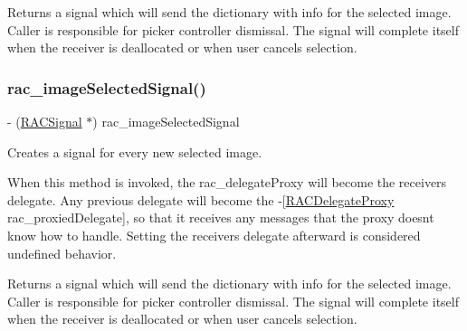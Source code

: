 Returns a signal which will send the dictionary with info for the selected image. Caller is responsible for picker controller dismissal. The signal will complete itself when the receiver is deallocated or when user cancels selection. \mbox{\label{category_u_i_image_picker_controller_07_r_a_c_signal_support_08_ab9e581c9f1e505147acaae5b26c6be13}} 
\subsubsection{\texorpdfstring{rac\+\_\+image\+Selected\+Signal()}{rac\_imageSelectedSignal()}\hspace{0.1cm}{\footnotesize\ttfamily [2/3]}}
{\footnotesize\ttfamily -\/ (\mbox{\hyperlink{interface_r_a_c_signal}{R\+A\+C\+Signal}} $\ast$) rac\+\_\+image\+Selected\+Signal \begin{DoxyParamCaption}{ }\end{DoxyParamCaption}}

Creates a signal for every new selected image.

When this method is invoked, the {\ttfamily rac\+\_\+delegate\+Proxy} will become the receiver\textquotesingle{}s delegate. Any previous delegate will become the -\/\mbox{[}\mbox{\hyperlink{interface_r_a_c_delegate_proxy}{R\+A\+C\+Delegate\+Proxy}} rac\+\_\+proxied\+Delegate\mbox{]}, so that it receives any messages that the proxy doesn\textquotesingle{}t know how to handle. Setting the receiver\textquotesingle{}s {\ttfamily delegate} afterward is considered undefined behavior.

Returns a signal which will send the dictionary with info for the selected image. Caller is responsible for picker controller dismissal. The signal will complete itself when the receiver is deallocated or when user cancels selection. \mbox{\label{category_u_i_image_picker_controller_07_r_a_c_signal_support_08_ab9e581c9f1e505147acaae5b26c6be13}} 
